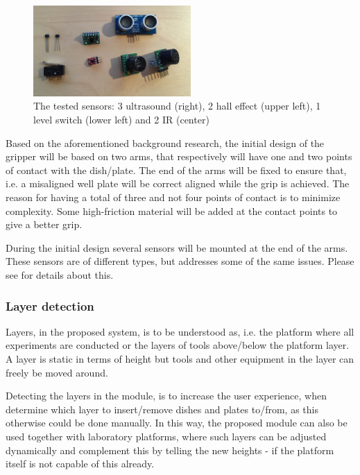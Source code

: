 \documentclass[10pt,a4paper]{article}
\begin{document}
	
		
	\begin{figure}
		\includegraphics[width=6cm]{images/sensors.png}
		\caption{The tested sensors: 3 ultrasound (right), 2 hall effect (upper left), 1 level switch (lower left) and 2 IR (center)}
		\label{fig::sensors}
	\end{figure}
	
	Based on the aforementioned background research, the initial design of the gripper will be based on two arms, that respectively will have one and two points of contact with the dish/plate. The end of the arms will be fixed to ensure that, i.e. a misaligned well plate will be correct aligned while the grip is achieved. The reason for having a total of three and not four points of contact is to minimize complexity. Some high-friction material will be added at the contact points to give a better grip.
	
	During the initial design several sensors will be mounted at the end of the arms. These sensors are of different types, but addresses some of the same issues. Please see  for details about this.


	\subsubsection{Layer detection}\label{subsub:Initial_LayerDetection}
	Layers, in the proposed system, is to be understood as, i.e. the platform where all experiments are conducted or the layers of tools above/below the platform layer. A layer is static in terms of height but tools and other equipment in the layer can freely be moved around.
	
	
	Detecting the layers in the module, is to increase the user experience, when determine which layer to insert/remove dishes and plates to/from, as this otherwise could be done manually. In this way, the proposed module can also be used together with laboratory platforms, where such layers can be adjusted dynamically and complement this by telling the new heights - if the platform itself is not capable of this already.
	
\end{document}

